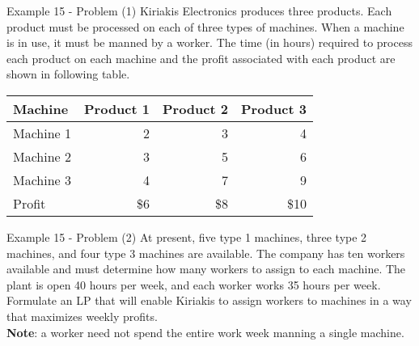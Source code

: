 \begin{frame}{Example 15 - Problem (1)}
Kiriakis Electronics produces three products. Each product must be processed on
each of three types of machines. When a machine is in use, it must be manned
by a worker. The time (in hours) required to process each product on each
machine and the profit associated with each product are shown in following
table.

\begin{center}
\begin{tabular}{lrrr}
\hline
  \cellcolor{gray90}\textbf{Machine}
& \cellcolor{gray90}\textbf{Product 1}
& \cellcolor{gray90}\textbf{Product 2}
& \cellcolor{gray90}\textbf{Product 3} \\
\hline
Machine 1 & 2 & 3 & 4 \\
Machine 2 & 3 & 5 & 6 \\
Machine 3 & 4 & 7 & 9 \\
\hline
Profit & \$6 & \$8 & \$10 \\
\hline
\end{tabular}
\end{center}

\end{frame}

\begin{frame}{Example 15 - Problem (2)}
At present, five type 1 machines, three type 2 machines, and four type 3
machines are available. The company has ten workers available and must determine
how many workers to assign to each machine. The plant is open 40 hours per week,
and each worker works 35 hours per week. Formulate an LP that will enable
Kiriakis to assign workers to machines in a way that maximizes weekly profits. \\
\vspace{3mm}
{\small \textbf{Note}:
a worker need not spend the entire work week manning a single machine.
}
\end{frame}

